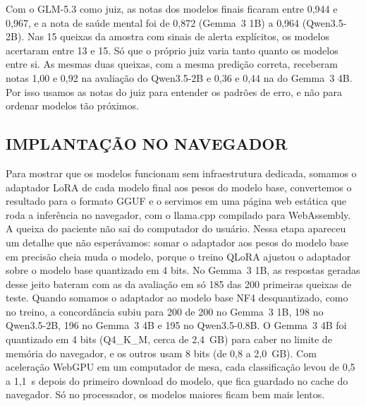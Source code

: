 \documentclass{ieeeaccess}
\begin{document}
Com o GLM-5.3 como juiz, as notas dos modelos finais ficaram entre 0,944 e 0,967, e a nota de sa\'ude mental foi de 0,872 (Gemma~3 1B) a 0,964 (Qwen3.5-2B). Nas 15 queixas da amostra com sinais de alerta expl\'icitos, os modelos acertaram entre 13 e 15. S\'o que o pr\'oprio juiz varia tanto quanto os modelos entre si. As mesmas duas queixas, com a mesma predi\c{c}\~ao correta, receberam notas 1,00 e 0,92 na avalia\c{c}\~ao do Qwen3.5-2B e 0,36 e 0,44 na do Gemma~3 4B. Por isso usamos as notas do juiz para entender os padr\~oes de erro, e n\~ao para ordenar modelos t\~ao pr\'oximos.

\subsection{IMPLANTA\c{C}\~AO NO NAVEGADOR}
Para mostrar que os modelos funcionam sem infraestrutura dedicada, somamos o adaptador LoRA de cada modelo final aos pesos do modelo base, convertemos o resultado para o formato GGUF e o servimos em uma p\'agina web est\'atica que roda a infer\^encia no navegador, com o llama.cpp \cite{b23} compilado para WebAssembly. A queixa do paciente n\~ao sai do computador do usu\'ario. Nessa etapa apareceu um detalhe que n\~ao esper\'avamos: somar o adaptador aos pesos do modelo base em precis\~ao cheia muda o modelo, porque o treino QLoRA ajustou o adaptador sobre o modelo base quantizado em 4 bits. No Gemma~3 1B, as respostas geradas desse jeito bateram com as da avalia\c{c}\~ao em s\'o 185 das 200 primeiras queixas de teste. Quando somamos o adaptador ao modelo base NF4 desquantizado, como no treino, a concord\^ancia subiu para 200 de 200 no Gemma~3 1B, 198 no Qwen3.5-2B, 196 no Gemma~3 4B e 195 no Qwen3.5-0.8B. O Gemma~3 4B foi quantizado em 4 bits (Q4\_K\_M, cerca de 2,4~GB) para caber no limite de mem\'oria do navegador, e os outros usam 8 bits (de 0,8 a 2,0~GB). Com acelera\c{c}\~ao WebGPU em um computador de mesa, cada classifica\c{c}\~ao levou de 0,5 a 1,1~s depois do primeiro download do modelo, que fica guardado no cache do navegador. S\'o no processador, os modelos maiores ficam bem mais lentos.
\end{document}

